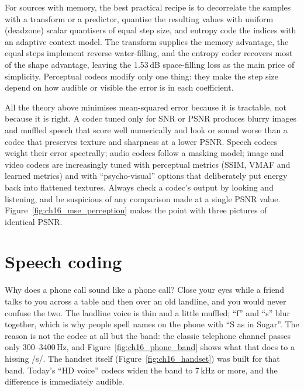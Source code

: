\begin{keyidea}
For sources with memory, the best practical recipe is to decorrelate the samples with a transform
or a predictor, quantise the resulting values with uniform (deadzone) scalar quantisers of equal
step size, and entropy code the indices with an adaptive context model. The transform supplies the
memory advantage, the equal steps implement reverse water-filling, and the entropy coder recovers
most of the shape advantage, leaving the 1.53\,dB space-filling loss as the main price of
simplicity. Perceptual codecs modify only one thing: they make the step size depend on how audible
or visible the error is in each coefficient.
\end{keyidea}


\begin{pitfall}
All the theory above minimises mean-squared error because it is tractable, not because it is right.
A codec tuned only for SNR or PSNR produces blurry images and muffled speech that score well
numerically and look or sound worse than a codec that preserves texture and sharpness at a lower
PSNR. Speech codecs weight their error spectrally; audio codecs follow a masking model; image and
video codecs are increasingly tuned with perceptual metrics (SSIM, VMAF and learned metrics) and
with ``psycho-visual'' options that deliberately put energy back into flattened textures. Always
check a codec's output by looking and listening, and be suspicious of any comparison made at a
single PSNR value. Figure~\ref{fig:ch16_mse_perception} makes the point with three pictures of
identical PSNR.
\end{pitfall}

\section{Speech coding}
\label{sec:ch16:speech}

Why does a phone call sound like a phone call? Close your eyes while a friend talks to you across
a table and then over an old landline, and you would never confuse the two. The landline voice is
thin and a little muffled; ``f'' and ``s'' blur together, which is why people spell names on the
phone with ``S as in Sugar''. The reason is not the codec at all but the band: the classic
telephone channel passes only 300--3400\,Hz, and Figure~\ref{fig:ch16_phone_band} shows what that
does to a hissing /s/. The handset itself (Figure~\ref{fig:ch16_handset}) was built for that band. Today's ``HD voice'' codecs widen the band to 7\,kHz or more, and the
difference is immediately audible.


